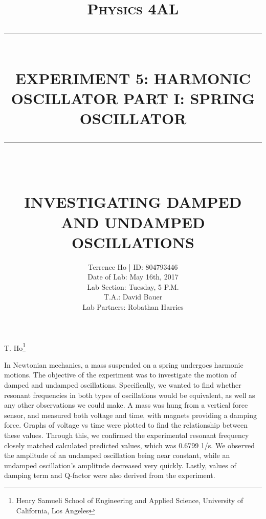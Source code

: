 \documentclass[11pt]{report}
\newcommand{\HRule}[1]{\rule{\linewidth}{#1}}
\begin{document}
\title{ \normalsize \textsc{Physics 4AL}
        \\ [2.0cm]
        \HRule{0.5pt} \\
        \LARGE \textbf{\uppercase{Experiment 5: Harmonic Oscillator Part I:
        Spring Oscillator}}
        \HRule{2pt} \\ [0.5cm]
        \vspace*{2\baselineskip}}

\date{}

\author{
        Terrence Ho | ID: 804793446 \\ 
        Date of Lab: May 16th, 2017 \\
        Lab Section: Tuesday, 5 P.M.\\
        T.A.: David Bauer\\
        Lab Partners: Robathan Harries}

\maketitle
\tableofcontents
\newpage

\sectionfont{\scshape}

\begin{center}
\title{
    \Large \textbf{\uppercase{Investigating Damped and Undamped Oscillations}}
}

T. Ho\footnote{Henry Samueli School of Engineering and Applied Science,
University of California, Los Angeles}
\end{center}

In Newtonian mechanics, a mass suspended on a spring undergoes harmonic motions.
The objective of the experiment was to investigate the motion of damped and
undamped oscillations. Specifically, we wanted to find whether
resonant frequencies in both types of oscillations would be equivalent, as well
as any other observations we could make.  A mass
was hung from a vertical force sensor, and measured both voltage and time, with
magnets providing a damping force. Graphs of voltage vs time were plotted to
find the relationship between these values. Through this, we confirmed the 
experimental resonant frequency closely matched calculated predicted values, which was
0.6799 1/s. We observed the amplitude of an undamped oscillation being near
constant, while an undamped oscillation's amplitude decreased very quickly.
Lastly, values of damping term and Q-factor were also derived from the
experiment. 
\end{document}
